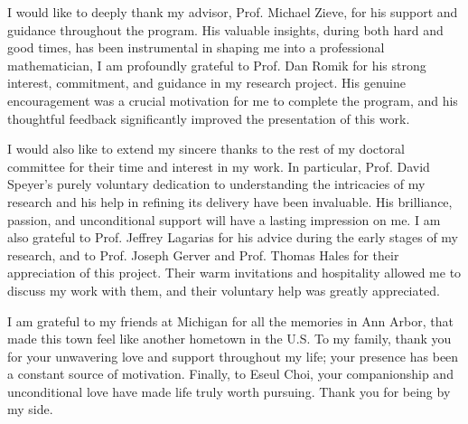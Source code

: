 I would like to deeply thank my advisor, Prof. Michael Zieve,
for his support and guidance throughout the program.
His valuable insights, during both hard and good times,
has been instrumental in shaping me into a professional mathematician,
I am profoundly grateful to Prof. Dan Romik for his strong interest, commitment, and guidance in my research project.
His genuine encouragement was a crucial motivation for me to complete the program,
and his thoughtful feedback significantly improved the presentation of this work.

I would also like to extend my sincere thanks to the rest of my doctoral committee for their time and interest in my work.
In particular, Prof. David Speyer's purely voluntary dedication to understanding the intricacies of my research and 
his help in refining its delivery have been invaluable.
His brilliance, passion, and unconditional support will have a lasting impression on me.
I am also grateful to Prof. Jeffrey Lagarias for his advice during the early stages of my research, 
and to Prof. Joseph Gerver and Prof. Thomas Hales for their appreciation of this project.
Their warm invitations and hospitality allowed me to discuss my work with them,
and their voluntary help was greatly appreciated.

I am grateful to my friends at Michigan for all the memories in Ann Arbor,
that made this town feel like another hometown in the U.S.
To my family, thank you for your unwavering love and support throughout my life; your presence has been a constant source of motivation.
Finally, to Eseul Choi, your companionship and unconditional love have made life truly worth pursuing.
Thank you for being by my side.